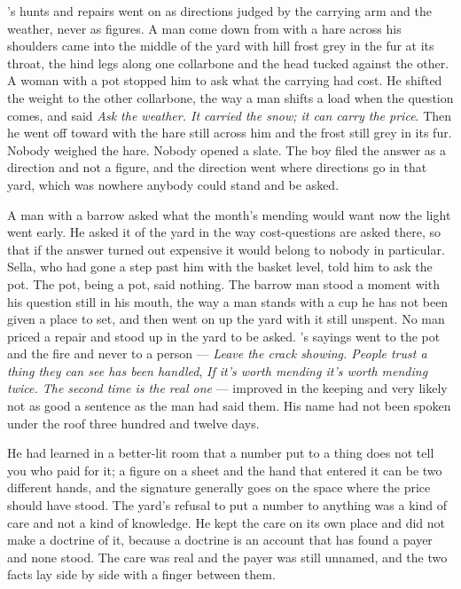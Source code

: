 \scenebreak

's hunts and repairs went on as directions judged by the carrying arm and the weather, never as figures. A man come down from  with a hare across his shoulders came into the middle of the yard with hill frost grey in the fur at its throat, the hind legs along one collarbone and the head tucked against the other. A woman with a pot stopped him to ask what the carrying had cost. He shifted the weight to the other collarbone, the way a man shifts a load when the question comes, and said \emph{Ask the weather. It carried the snow; it can carry the price}. Then he went off toward  with the hare still across him and the frost still grey in its fur. Nobody weighed the hare. Nobody opened a slate. The boy filed the answer as a direction and not a figure, and the direction went where directions go in that yard, which was nowhere anybody could stand and be asked.

A man with a barrow asked what the month's mending would want now the light went early. He asked it of the yard in the way cost-questions are asked there, so that if the answer turned out expensive it would belong to nobody in particular. Sella, who had gone a step past him with the basket level, told him to ask the pot. The pot, being a pot, said nothing. The barrow man stood a moment with his question still in his mouth, the way a man stands with a cup he has not been given a place to set, and then went on up the yard with it still unspent. No man priced a repair and stood up in the yard to be asked. 's sayings went to the pot and the fire and never to a person --- \emph{Leave the crack showing. People trust a thing they can see has been handled}, \emph{If it's worth mending it's worth mending twice. The second time is the real one} --- improved in the keeping and very likely not as good a sentence as the man had said them. His name had not been spoken under the roof three hundred and twelve days.

He had learned in a better-lit room that a number put to a thing does not tell you who paid for it; a figure on a sheet and the hand that entered it can be two different hands, and the signature generally goes on the space where the price should have stood. The yard's refusal to put a number to anything was a kind of care and not a kind of knowledge. He kept the care on its own place and did not make a doctrine of it, because a doctrine is an account that has found a payer and none stood. The care was real and the payer was still unnamed, and the two facts lay side by side with a finger between them.

